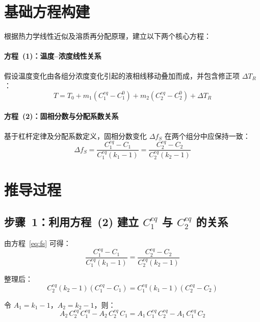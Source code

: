 \documentclass[12pt, a4paper]{article}
\begin{document}
\section{基础方程构建}

根据热力学线性近似及溶质再分配原理，建立以下两个核心方程：

\paragraph{方程~(1)：温度–浓度线性关系}

假设温度变化由各组分浓度变化引起的液相线移动叠加而成，并包含修正项 $\Delta T_R$：
\begin{equation}
  T = T_0 + m_1\!\left(C_1^{eq} - C_1^0\right) + m_2\!\left(C_2^{eq} - C_2^0\right) + \Delta T_R
  \label{eq:temp}
\end{equation}

\paragraph{方程~(2)：固相分数与分配系数关系}

基于杠杆定律及分配系数定义，固相分数变化 $\Delta f_S$ 在两个组分中应保持一致：
\begin{equation}
  \Delta f_S
  = \frac{C_1^{eq} - C_1}{C_1^{eq}(k_1 - 1)}
  = \frac{C_2^{eq} - C_2}{C_2^{eq}(k_2 - 1)}
  \label{eq:fs}
\end{equation}

\section{推导过程}

\subsection{步骤~1：利用方程~(2) 建立 $C_1^{eq}$ 与 $C_2^{eq}$ 的关系}

由方程~\eqref{eq:fs} 可得：
\[
  \frac{C_1^{eq} - C_1}{C_1^{eq}(k_1 - 1)}
  = \frac{C_2^{eq} - C_2}{C_2^{eq}(k_2 - 1)}
\]

整理后：
\[
  C_2^{eq}(k_2 - 1)(C_1^{eq} - C_1)
  = C_1^{eq}(k_1 - 1)(C_2^{eq} - C_2)
\]

令 $A_1 = k_1 - 1$，$A_2 = k_2 - 1$，则：
\[
  A_2\,C_2^{eq}\,C_1^{eq} - A_2\,C_2^{eq}\,C_1
  = A_1\,C_1^{eq}\,C_2^{eq} - A_1\,C_1^{eq}\,C_2
\]
\end{document}
